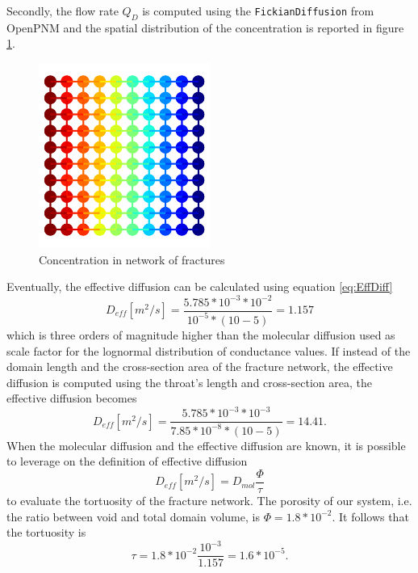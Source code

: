 \documentclass{article}
\begin{document}
Secondly, the flow rate $Q_D$ is computed using the \texttt{FickianDiffusion} from OpenPNM and the spatial distribution of the concentration is reported in figure \ref{fig:ConcInFractures}.
\FloatBarrier  %
\begin{figure}[h]
    \centering
    \includegraphics[width=0.5\textwidth]{images/fromOpenPNM/concentrationHeatMap.png}
    \caption{Concentration in network of fractures}
    \label{fig:ConcInFractures}
\end{figure}
Eventually, the effective diffusion can be calculated using equation \ref{eq:EffDiff}
\begin{equation}
    D_{eff} [m^2/s]=\frac{5.785*10^{-3}*10^{-2}}{10^{-5}*(10-5)}=1.157
    \label{eq:EffDiffDomain}
\end{equation}
which is three orders of magnitude higher than the molecular diffusion used as scale factor for the lognormal distribution of conductance values.
If instead of the domain length and the cross-section area of the fracture network, the effective diffusion is computed using the throat's length and cross-section area, the effective diffusion becomes
\begin{equation}
    D_{eff} [m^2/s]=\frac{5.785*10^{-3}*10^{-3}}{7.85*10^{-8}*(10-5)}=14.41.
    \label{eq:EffDiffFracture}
\end{equation}
When the molecular diffusion and the effective diffusion are known, it is possible to leverage on the definition of effective diffusion
\begin{equation}
    D_{eff} [m^2/s]=D_{mol}\frac{\Phi}{\tau}
    \label{eq:EffDiffDef}
\end{equation}
to evaluate the tortuosity of the fracture network. The porosity of our system, i.e. the ratio between void and total domain volume, is $\Phi=1.8*10^{-2}$. It follows that the tortuosity is
\begin{equation}
    \tau = 1.8*10^{-2}\frac{10^{-3}}{1.157} = 1.6*10^{-5}.
    \label{eq:Tortuosity}
\end{equation}

\FloatBarrier  %
\end{document}
